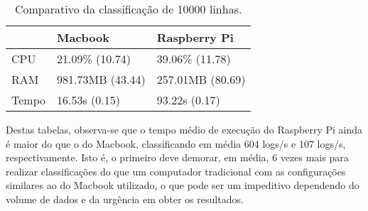 \begin{table}[!ht]
    \centering
    \begin{tabular}{|l|l|l|}
    \hline
        ~ & Macbook & Raspberry Pi \\ \hline
        CPU & 21.09\% (10.74) & 39.06\% (11.78) \\ \hline
        RAM & 981.73MB (43.44) & 257.01MB (80.69) \\ \hline
        Tempo & 16.53s (0.15) & 93.22s (0.17) \\ \hline
    \end{tabular}

    \caption{Comparativo da classificação de 10000 linhas.\label{tab:comparativo_classificacao_10000}}
\end{table}


Destas tabelas, observa-se que o tempo médio de execução do Raspberry Pi ainda é maior 
do que o do Macbook, classificando em média 604 logs/s e 107 logs/s, respectivamente. Isto é,
o primeiro deve demorar, em média, 6 vezes mais para realizar classificações do que um computador tradicional 
com as configurações similares ao do Macbook utilizado, o que pode ser um impeditivo dependendo do 
volume de dados e da urgência em obter os resultados.
